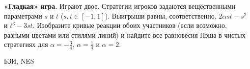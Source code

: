 \begin{problem}
 {\bf «Гладкая» игра.} Играют двое. Стратегии
игроков задаются вещёственными параметрами $s$ и $t$
(${s,t\in[-1,1]}$). Выигрыши равны, соответственно,
$2\alpha st-s^2$ и $t^3-3st$. Изобразите кривые реакции
обоих участников (если возможно, разными цветами или
стилями линий) и найдите все равновесия Нэша в чистых
стратегиях для $\alpha=-\frac{3}{4}$, $\alpha=\frac{1}{4}$ и
$\alpha=2$.



\begin{source}
БЗИ, NES
\end{source}


\begin{sol}

\end{sol}
\end{problem}




